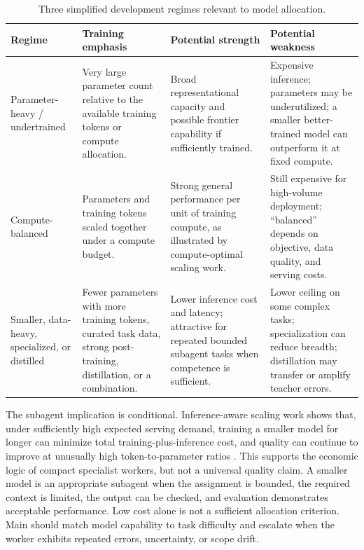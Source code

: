 \documentclass[11pt,a4paper]{article}
\begin{document}
\begin{table}[H]
\centering
\caption{Three simplified development regimes relevant to model allocation.}
\begin{tabularx}{\textwidth}{P{0.20\textwidth}P{0.24\textwidth}Y Y}
\toprule
\textbf{Regime} & \textbf{Training emphasis} & \textbf{Potential strength} & \textbf{Potential weakness} \\
\midrule
Parameter-heavy / undertrained & Very large parameter count relative to the available training tokens or compute allocation. & Broad representational capacity and possible frontier capability if sufficiently trained. & Expensive inference; parameters may be underutilized; a smaller better-trained model can outperform it at fixed compute. \\
Compute-balanced & Parameters and training tokens scaled together under a compute budget. & Strong general performance per unit of training compute, as illustrated by compute-optimal scaling work. & Still expensive for high-volume deployment; ``balanced'' depends on objective, data quality, and serving costs. \\
Smaller, data-heavy, specialized, or distilled & Fewer parameters with more training tokens, curated task data, strong post-training, distillation, or a combination. & Lower inference cost and latency; attractive for repeated bounded subagent tasks when competence is sufficient. & Lower ceiling on some complex tasks; specialization can reduce breadth; distillation may transfer or amplify teacher errors. \\
\bottomrule
\end{tabularx}
\end{table}

The subagent implication is conditional. Inference-aware scaling work shows that, under sufficiently high expected serving demand, training a smaller model for longer can minimize total training-plus-inference cost, and quality can continue to improve at unusually high token-to-parameter ratios \cite{sardana2024}. This supports the economic logic of compact specialist workers, but not a universal quality claim. A smaller model is an appropriate subagent when the assignment is bounded, the required context is limited, the output can be checked, and evaluation demonstrates acceptable performance. Low cost alone is not a sufficient allocation criterion. Main should match model capability to task difficulty and escalate when the worker exhibits repeated errors, uncertainty, or scope drift.
\end{document}
